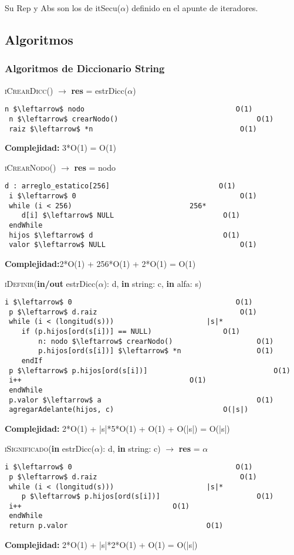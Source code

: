     Su Rep y Abs son los de itSecu($\alpha$) definido en el apunte de iteradores.

  \subsection{Algoritmos}
\subsubsection{Algoritmos de Diccionario String}

\textsc{iCrearDicc}() $\rightarrow$ \textbf{res} = estrDicc($\alpha$)
\begin{lstlisting}[mathescape]
 n $\leftarrow$ nodo									O(1)
 n $\leftarrow$ crearNodo() 								O(1)
 raiz $\leftarrow$ *n 									O(1)
\end{lstlisting}
\textbf{Complejidad:} 3*O(1) = O(1)

\textsc{iCrearNodo}() $\rightarrow$ \textbf{res} = nodo
\begin{lstlisting}[mathescape]
 d : arreglo_estatico[256] 							O(1)
 i $\leftarrow$ 0 										O(1)
 while (i < 256) 							256*
 	d[i] $\leftarrow$ NULL 							O(1)
 endWhile
 hijos $\leftarrow$ d 								O(1)
 valor $\leftarrow$ NULL 								O(1)
\end{lstlisting}
\textbf{Complejidad:}2*O(1) + 256*O(1) + 2*O(1) = O(1)

\textsc{iDefinir}(\textbf{in/out} estrDicc($\alpha$): d, \textbf{in} string: c, \textbf{in} alfa: s)
\begin{lstlisting}[mathescape]
 i $\leftarrow$ 0 										O(1)
 p $\leftarrow$ d.raiz 									O(1)
 while (i < (longitud(s))) 						|s|*
 	if (p.hijos[ord(s[i])] == NULL) 				O(1)
		n: nodo $\leftarrow$ crearNodo() 					O(1)
		p.hijos[ord(s[i])] $\leftarrow$ *n 					O(1)
	endIf
 p $\leftarrow$ p.hijos[ord(s[i])] 								O(1)
 i++ 										O(1)
 endWhile
 p.valor $\leftarrow$ a 									O(1)
 agregarAdelante(hijos, c) 							O(|s|)
\end{lstlisting}
\textbf{Complejidad:} 2*O(1) + |s|*5*O(1) + O(1) + O(|s|) = O(|s|)

\textsc{iSignificado}(\textbf{in} estrDicc($\alpha$): d, \textbf{in} string: c) $\rightarrow$ \textbf{res} = $\alpha$
\begin{lstlisting}[mathescape]
 i $\leftarrow$ 0 										O(1)
 p $\leftarrow$ d.raiz 									O(1)
 while (i < (longitud(s))) 						|s|*
	p $\leftarrow$ p.hijos[ord(s[i])] 						O(1)
 i++ 									O(1)
 endWhile
 return p.valor 								O(1)
\end{lstlisting}
\textbf{Complejidad:} 2*O(1) + |s|*2*O(1) + O(1) = O(|s|)

